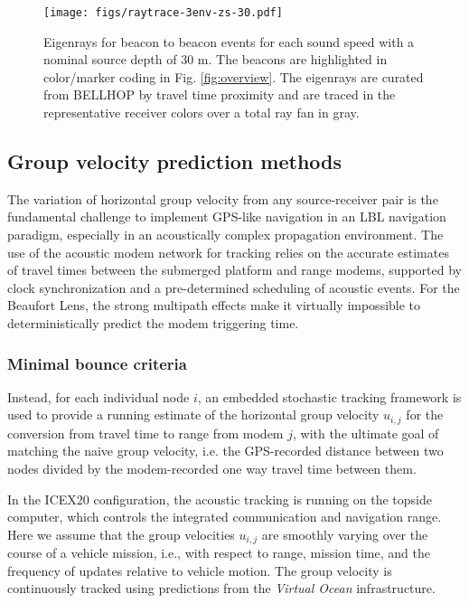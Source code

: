 \begin{figure}[h!]
  \centering
  \texttt{[image: figs/raytrace-3env-zs-30.pdf]}
  \caption{Eigenrays for beacon to beacon events for each sound speed with a nominal source depth of 30 m. The beacons are highlighted in color/marker coding in Fig. \ref{fig:overview}. The eigenrays are curated from BELLHOP by travel time proximity and are traced in the representative receiver colors over a total ray fan in gray.}
  \label{fig:raytrace-zs30}
  \end{figure}

\FloatBarrier
\subsection{Group velocity prediction methods}

The variation of horizontal group velocity from any source-receiver pair is the fundamental challenge to implement GPS-like navigation in an LBL navigation paradigm, especially in an acoustically complex propagation environment.
The use of the acoustic modem network for tracking relies on the accurate estimates of travel times between the submerged platform and range modems, supported by clock synchronization and a pre-determined scheduling of acoustic events.
For the Beaufort Lens, the strong multipath effects make it virtually impossible to deterministically predict the modem triggering time.

\subsubsection{Minimal bounce criteria}
Instead, for each individual node $i$, an embedded stochastic tracking framework is used to provide a running estimate of the horizontal group velocity $u_{i,j}$ for the conversion from travel time to range from modem $j$, with the ultimate goal of matching the naive group velocity, i.e. the GPS-recorded distance between two nodes divided by the modem-recorded one way travel time between them. 

In the ICEX20 configuration, the acoustic tracking is running on the topside computer, which controls the integrated communication and navigation range.
Here we assume that the group velocities $u_{i,j}$ are smoothly varying over the course of a vehicle mission, i.e., with respect to range, mission time, and the frequency of updates relative to vehicle motion. 
The group velocity is continuously tracked using predictions from the \textit{Virtual Ocean} infrastructure.

